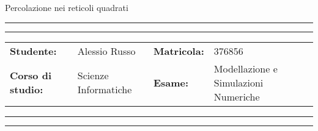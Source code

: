 \documentclass[11pt]{article}
\newcommand{\studentname}{Alessio Russo}
\newcommand{\studentnumber}{376856}
\newcommand{\course}{Scienze Informatiche}
\newcommand{\exam}{Modellazione e Simulazioni Numeriche}
\begin{document}
\begin{center}
{\Huge{Percolazione nei reticoli quadrati}} \\
\end{center}

\vspace{5mm}
\hrule
\vspace{1mm}
\hrule
\vspace{3mm}
\begin{center}
	\begin{tabular}{llll}
		\textbf{Studente: } & {\studentname}  & \textbf{Matricola:}  & {\studentnumber}  \\ 
		\textbf{Corso di studio: } & {\course}& \textbf{Esame:} & {\exam}\\ 
	\end{tabular}
\end{center}
\vspace{3mm}
\hrule
\vspace{1mm}
\hrule




\end{document}
